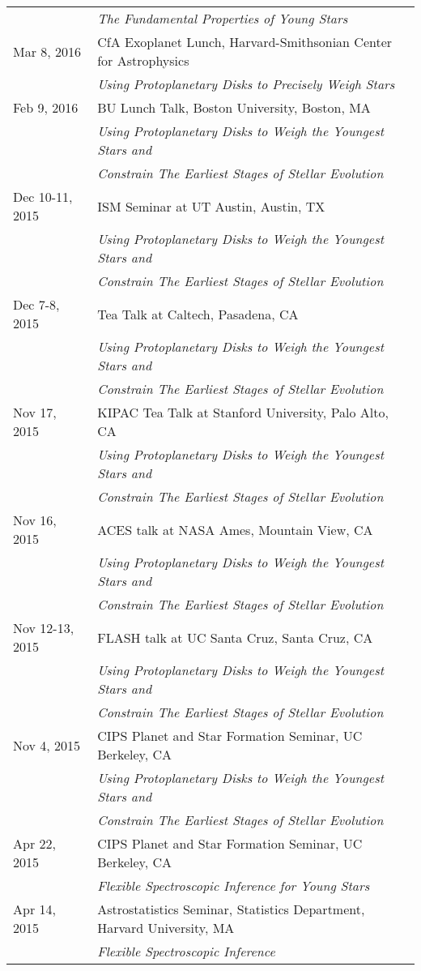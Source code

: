 \begin{longtable}{@{\hspace{10pt}}p{1.2in}l}
  & \emph{The Fundamental Properties of Young Stars} \\[\rowskip]
  Mar 8, 2016 & CfA Exoplanet Lunch, Harvard-Smithsonian Center for Astrophysics \\
  & \emph{Using Protoplanetary Disks to Precisely Weigh Stars} \\[\rowskip]
  Feb 9, 2016 & BU Lunch Talk, Boston University, Boston, MA \\
  & \emph{Using Protoplanetary Disks to Weigh the Youngest Stars and} \\
  & \emph{Constrain The Earliest Stages of Stellar Evolution} \\[\rowskip]
  Dec 10-11, 2015 & ISM Seminar at UT Austin, Austin, TX \\
  & \emph{Using Protoplanetary Disks to Weigh the Youngest Stars and} \\
  & \emph{Constrain The Earliest Stages of Stellar Evolution} \\[\rowskip]
  Dec 7-8, 2015 & Tea Talk at Caltech, Pasadena, CA \\
  & \emph{Using Protoplanetary Disks to Weigh the Youngest Stars and} \\
  & \emph{Constrain The Earliest Stages of Stellar Evolution} \\[\rowskip]
  Nov 17, 2015 & KIPAC Tea Talk at Stanford University, Palo Alto, CA \\
  & \emph{Using Protoplanetary Disks to Weigh the Youngest Stars and} \\
  & \emph{Constrain The Earliest Stages of Stellar Evolution} \\[\rowskip]
  Nov 16, 2015 & ACES talk at NASA Ames, Mountain View, CA \\
  & \emph{Using Protoplanetary Disks to Weigh the Youngest Stars and} \\
  & \emph{Constrain The Earliest Stages of Stellar Evolution} \\[\rowskip]
  Nov 12-13, 2015 & FLASH talk at UC Santa Cruz, Santa Cruz, CA \\
  & \emph{Using Protoplanetary Disks to Weigh the Youngest Stars and} \\
  & \emph{Constrain The Earliest Stages of Stellar Evolution} \\[\rowskip]
  Nov 4, 2015 & CIPS Planet and Star Formation Seminar, UC Berkeley, CA\\
  & \emph{Using Protoplanetary Disks to Weigh the Youngest Stars and} \\
  & \emph{Constrain The Earliest Stages of Stellar Evolution} \\[\rowskip]
  Apr 22, 2015 & CIPS Planet and Star Formation Seminar, UC Berkeley, CA\\
  & \emph{Flexible Spectroscopic Inference for Young Stars} \\[\rowskip]
  Apr 14, 2015 & Astrostatistics Seminar, Statistics Department, Harvard University, MA \\
  & \emph{Flexible Spectroscopic Inference} \\[\rowskip]
\end{longtable}

